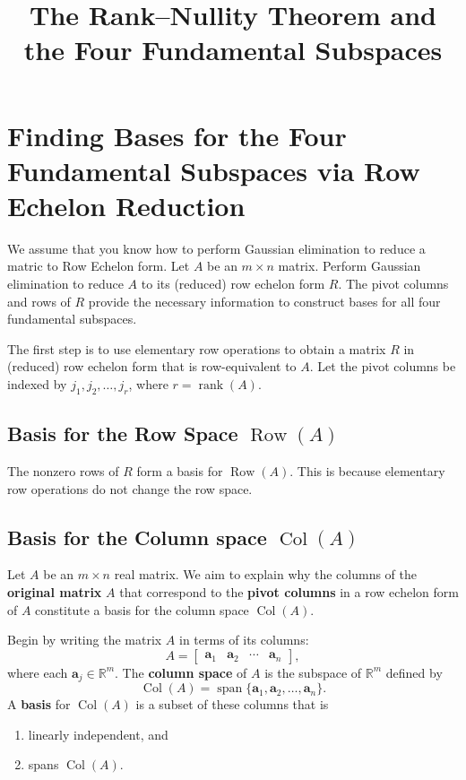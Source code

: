 \documentclass{article}
\title{The Rank--Nullity Theorem and the Four Fundamental Subspaces}
\author{}
\date{}
\begin{document}
\maketitle

\Large


\section*{Finding Bases for the Four Fundamental Subspaces via Row Echelon Reduction}

We assume that you know how to perform Gaussian elimination to reduce a matric to Row Echelon form. Let $A$ be an $m \times n$ matrix. Perform Gaussian elimination to reduce $A$ to its (reduced) row echelon form $R$. The pivot columns and rows of $R$ provide the necessary information to construct bases for all four fundamental subspaces.

The first step is to use elementary row operations to obtain a matrix $R$ in (reduced) row echelon form that is row-equivalent to $A$. Let the pivot columns be indexed by $j_1, j_2, \dots, j_r$, where $r = \operatorname{rank}(A)$.

\subsection*{Basis for the Row Space $\operatorname{Row}(A)$}
The nonzero rows of $R$ form a basis for $\operatorname{Row}(A)$. This is because elementary row operations do not change the row space.

\subsection*{Basis for the Column space $\operatorname{Col}(A)$}

Let $A$ be an $m \times n$ real matrix. We aim to explain why the columns of the \textbf{original matrix} $A$ that correspond to the \textbf{pivot columns} in a row echelon form of $A$ constitute a basis for the column space $\operatorname{Col}(A)$.

Begin by writing the matrix $A$ in terms of its columns:
\[
A = \begin{bmatrix} \mathbf{a}_1 & \mathbf{a}_2 & \cdots & \mathbf{a}_n \end{bmatrix},
\]
where each $\mathbf{a}_j \in \mathbb{R}^m$. The \textbf{column space} of $A$ is the subspace of $\mathbb{R}^m$ defined by
\[
\operatorname{Col}(A) = \operatorname{span}\{ \mathbf{a}_1, \mathbf{a}_2, \dots, \mathbf{a}_n \}.
\]
A \textbf{basis} for $\operatorname{Col}(A)$ is a subset of these columns that is
\begin{enumerate}[label=(\roman*)]
    \item linearly independent, and
    \item spans $\operatorname{Col}(A)$.
\end{enumerate}
\end{document}
